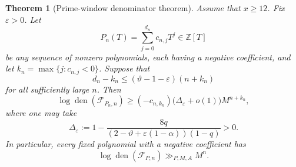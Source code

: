 \documentclass[11pt,oneside]{article}
\newtheorem{theorem}{Theorem}[section]
\theoremstyle{definition}
\theoremstyle{remark}
\newcommand{\Z}{\mathbb Z}
\newcommand{\thetaAE}{\vartheta}
\newcommand{\den}{\operatorname{den}}
\newcommand{\cF}{\mathcal F}
\begin{document}
\begin{theorem}[Prime-window denominator theorem]
\label{thm:prime-window}
Assume that $x\ge12$.  Fix $\varepsilon>0$.  Let
\[
 P_n(T)=\sum_{j=0}^{d_n}c_{n,j}T^j\in\Z[T]
\]
be any sequence of nonzero polynomials, each having a negative coefficient, and let
$k_n=\max\{j:c_{n,j}<0\}$.  Suppose that
\begin{equation}
 d_n-k_n\le
 (\thetaAE-1-\varepsilon)(n+k_n)
 \label{eq:subcritical-span}
\end{equation}
for all sufficiently large $n$.  Then
\begin{equation}
 \log\den(\cF_{P_n,n})
 \ge(-c_{n,k_n})\bigl(\Delta_\varepsilon+o(1)\bigr)M^{n+k_n},
 \label{eq:prime-window-den-lower}
\end{equation}
where one may take
\begin{equation}
 \Delta_\varepsilon
 :=1-
 \frac{8q}
 {(2-\thetaAE+\varepsilon(1-\alpha))(1-q)}
 >0.
 \label{eq:Delta-epsilon}
\end{equation}
In particular, every fixed polynomial with a negative coefficient has
\begin{equation}
 \log\den(\cF_{P,n})\gg_{P,M,A}M^n.
 \label{eq:fixed-den-exponential}
\end{equation}
\end{theorem}
\end{document}
